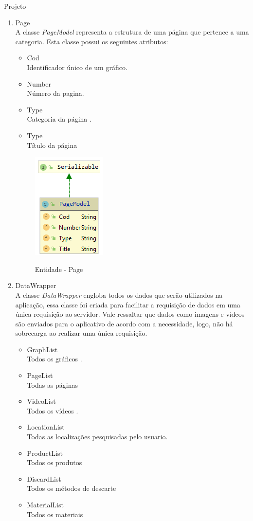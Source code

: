 \documentclass[
	12pt,				%
	openright,			%
	twoside,			%
	a4paper,			%
	english,			%
	french,				%
	spanish,			%
	brazil				%
	]{abntex2}
\begin{document}
\begin{chapter}{Projeto}
\begin{enumerate}
  \item{Page}   \\ A classe \textit{PageModel} representa a estrutura de uma página que pertence a uma categoria. Esta classe possui os seguintes atributos:
  \begin{itemize}
  \item{Cod}\\ Identificador único de um gráfico.
       \item{Number}\\Número da pagina.
         \item{Type}\\ Categoria da página
         . \item{Type}\\ Título da página
\end{itemize}
\begin{figure}[h]
\centering
   \caption{Entidade - Page}
   \includegraphics[scale=1.0]{media/PageModel.png}
     \label{fig:pageModel}
\end{figure}

\item{DataWrapper}   \\ A classe \textit{DataWrapper} engloba todos os dados que serão utilizados na aplicação, essa classe foi criada para facilitar a requisição de dados em uma única requisição ao servidor. Vale ressaltar que dados como imagens e vídeos são enviados para o aplicativo de acordo com a necessidade, logo, não há sobrecarga ao realizar uma única requisição.
\newline
  \begin{itemize}
  \item{GraphList}\\ Todos os gráficos .
       \item{PageList}\\  Todas as páginas 
         \item{VideoList}\\ Todos os vídeos
         . \item{LocationList}\\ Todas as localizações pesquisadas pelo usuario.
         \item{ProductList}\\  Todos os produtos
         \item{DiscardList}\\ Todos os métodos de descarte 
         \item{MaterialList}\\  Todos os materiais
         

\end{itemize}
\end{enumerate}
\end{chapter}
\end{document}

